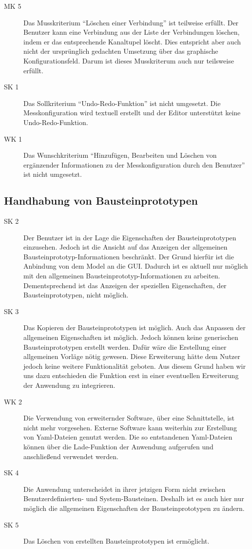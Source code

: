 \documentclass[parskip=full]{scrartcl}
\begin{document}
\begin{description}
\item[MK 5] Das Musskriterium "`Löschen einer Verbindung"' ist teilweise erfüllt. Der Benutzer kann eine Verbindung aus der Liste der Verbindungen löschen, indem er das entsprechende Kanaltupel löscht. Dies entspricht aber auch nicht der ursprünglich gedachten Umsetzung über das graphische Konfigurationsfeld. Darum ist dieses Musskriterum auch nur teilsweise erfüllt. 
\item[SK 1] Das Sollkriterium "`Undo-Redo-Funktion"' ist nicht umgesetzt. Die Messkonfiguration wird textuell erstellt und der Editor unterstützt keine Undo-Redo-Funktion. 
\item[WK 1] Das Wunschkriterium "`Hinzufügen, Bearbeiten und Löschen von ergänzender Informationen zu der Messkonfiguration durch den Benutzer"' ist nicht umgesetzt.
\end{description}
\subsection{Handhabung von Bausteinprototypen}

\begin{description}
	\item[SK 2] Der Benutzer ist in der Lage die Eigenschaften der Bausteinprototypen einzusehen. Jedoch ist die Ansicht auf das Anzeigen der \gls{allgemeinen Bausteinprototyp-Informationen} beschränkt. Der Grund hierfür ist die Anbindung von dem Model an die GUI. Dadurch ist es aktuell nur möglich mit den allgemeinen Bausteinprototyp-Informationen zu arbeiten. Dementsprechend ist das Anzeigen der speziellen Eigenschaften, der Bausteinprototypen, nicht möglich.
	\item[SK 3] Das Kopieren der Bausteinprototypen ist möglich. Auch das Anpassen der allgemeinen Eigenschaften ist möglich. Jedoch können keine generischen Bausteinprototypen erstellt werden. Dafür wäre die Erstellung einer allgemeinen Vorläge nötig gewesen. Diese Erweiterung hätte dem Nutzer jedoch keine weitere Funktionalität geboten. Aus diesem Grund haben wir uns dazu entschieden die Funktion erst in einer eventuellen Erweiterung der Anwendung zu integrieren.
	\item[WK 2] Die Verwendung von erweiternder Software, über eine Schnittstelle, ist nicht mehr vorgesehen. Externe Software kann weiterhin zur Erstellung von Yaml-Dateien genutzt werden. Die so entstandenen Yaml-Dateien können über die Lade-Funktion der Anwendung aufgerufen und anschließend verwendet werden.
	\item[SK 4] Die Anwendung unterscheidet in ihrer jetzigen Form nicht zwischen Benutzerdefinierten- und System-Bausteinen. Deshalb ist es auch hier nur möglich die allgemeinen Eigenschaften der Bausteinprototypen zu ändern.
	\item[SK 5] Das Löschen von erstellten Bausteinprototypen ist ermöglicht.
\end{description}
		
\end{document}
